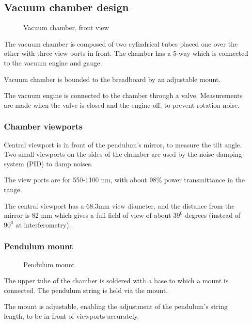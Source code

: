\documentclass[\main/master.tex]{subfiles}
\begin{document}
\subsection{Vacuum chamber design}
\begin{figure}[htbp]
	\centering
	\caption[Vacuum chamber, front view]{Vacuum chamber, front view}
	\label{fig:chamber front}
\end{figure}
\FloatBarrier

\par\noindent
The vacuum chamber is composed of two cylindrical tubes placed one over the other with three view ports in front. The chamber has a 5-way which is connected to the vacuum engine and gauge.
\par\noindent
Vacuum chamber is bounded to the breadboard by an adjustable mount.
\par\noindent
The vacuum engine is connected to the chamber through a valve. Measurements are made when the valve is closed and the engine off, to prevent rotation noise.

\subsubsection{Chamber viewports}
\par\noindent
Central viewport is in front of the pendulum's mirror, to measure the tilt angle. Two small viewports on the sides of the chamber are used by the noise damping system (PID) to damp noises. 
\par\noindent
The view ports are for 550-1100 nm, with about 98$\%$ power transmittance in the range.
\par\noindent
The central viewport has a 68.3mm view diameter, and the distance from the mirror is 82 mm which gives a full field of view of about $39^0$ degrees (instead of $90^0$ at interferometry).

\subsubsection{Pendulum mount}
\begin{figure}[htbp]
	\centering
	\caption[Pendulum mount]{Pendulum mount}
	\label{fig:mount}
\end{figure}
\FloatBarrier
\par\noindent
The upper tube of the chamber is soldered with a base to which a mount is connected. The pendulum string is held via the mount.
\par\noindent
The mount is adjustable, enabling the adjustment of the pendulum's string length, to be in front of viewports accurately. 
\end{document}
